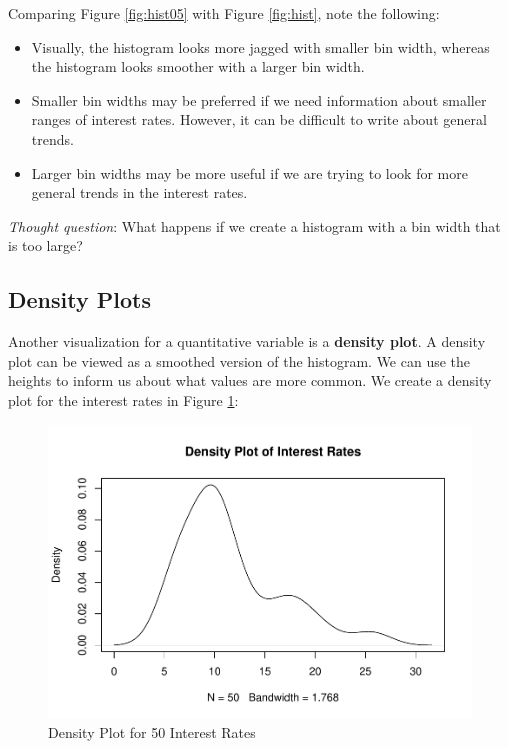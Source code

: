 \documentclass[
]{book}
\newenvironment{Shaded}{\begin{snugshade}}{\end{snugshade}}
\newcommand{\AttributeTok}[1]{\textcolor[rgb]{0.13,0.29,0.53}{#1}}
\newcommand{\DocumentationTok}[1]{\textcolor[rgb]{0.56,0.35,0.01}{\textbf{\textit{#1}}}}
\newcommand{\FunctionTok}[1]{\textcolor[rgb]{0.13,0.29,0.53}{\textbf{#1}}}
\newcommand{\NormalTok}[1]{#1}
\newcommand{\SpecialCharTok}[1]{\textcolor[rgb]{0.81,0.36,0.00}{\textbf{#1}}}
\newcommand{\StringTok}[1]{\textcolor[rgb]{0.31,0.60,0.02}{#1}}
\begin{document}
Comparing Figure \ref{fig:hist05} with Figure \ref{fig:hist}, note the following:

\begin{itemize}
\item
  Visually, the histogram looks more jagged with smaller bin width, whereas the histogram looks smoother with a larger bin width.
\item
  Smaller bin widths may be preferred if we need information about smaller ranges of interest rates. However, it can be difficult to write about general trends.
\item
  Larger bin widths may be more useful if we are trying to look for more general trends in the interest rates.
\end{itemize}

\emph{Thought question}: What happens if we create a histogram with a bin width that is too large?

\subsection{Density Plots}\label{densplots}

Another visualization for a quantitative variable is a \textbf{density plot}. A density plot can be viewed as a smoothed version of the histogram. We can use the heights to inform us about what values are more common. We create a density plot for the interest rates in Figure \ref{fig:dens}:

\begin{Shaded}
\end{Shaded}

\begin{figure}
\centering
\includegraphics{bookdown-demo_files/figure-latex/dens-1.pdf}
\caption{\label{fig:dens}Density Plot for 50 Interest Rates}
\end{figure}
\end{document}
